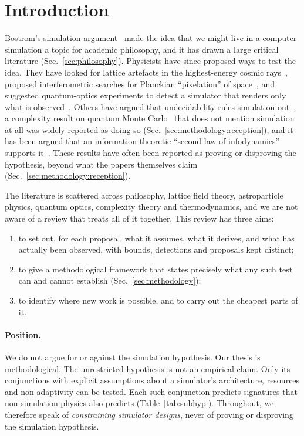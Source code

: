 \section{Introduction}
\label{sec:introduction}

Bostrom's simulation argument~\cite{Bostrom2003are} made the idea that we might live in a computer simulation a topic for academic philosophy, and it has drawn a large critical literature (Sec.~\ref{sec:philosophy}). Physicists have since proposed ways to test the idea. They have looked for lattice artefacts in the highest-energy cosmic rays~\cite{Beane2014constraints}, proposed interferometric searches for Planckian ``pixelation'' of space~\cite{Hogan2008measurement,Chou2016first}, and suggested quantum-optics experiments to detect a simulator that renders only what is observed~\cite{Campbell2017on}. Others have argued that undecidability rules simulation out~\cite{Faizal2025consequences}, a complexity result on quantum Monte Carlo~\cite{Ringel2017quantized} that does not mention simulation at all was widely reported as doing so (Sec.~\ref{sec:methodology:reception}), and it has been argued that an information-theoretic ``second law of infodynamics'' supports it~\cite{Vopson2023second}. These results have often been reported as proving or disproving the hypothesis, beyond what the papers themselves claim (Sec.~\ref{sec:methodology:reception}).

The literature is scattered across philosophy, lattice field theory, astroparticle physics, quantum optics, complexity theory and thermodynamics, and we are not aware of a review that treats all of it together. This review has three aims:
\begin{enumerate}
\item to set out, for each proposal, what it assumes, what it derives, and what has actually been observed, with bounds, detections and proposals kept distinct;
\item to give a methodological framework that states precisely what any such test can and cannot establish (Sec.~\ref{sec:methodology});
\item to identify where new work is possible, and to carry out the cheapest parts of it.
\end{enumerate}

\paragraph{Position.} We do not argue for or against the simulation hypothesis. Our thesis is methodological. The unrestricted hypothesis is not an empirical claim. Only its conjunctions with explicit assumptions about a simulator's architecture, resources and non-adaptivity can be tested. Each such conjunction predicts signatures that non-simulation physics also predicts (Table~\ref{tab:subhyp}). Throughout, we therefore speak of \emph{constraining simulator designs}, never of proving or disproving the simulation hypothesis.

